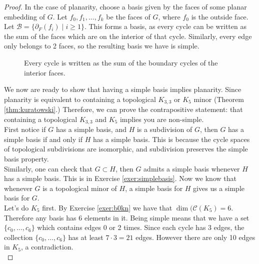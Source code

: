 \begin{proof}
 In the case of planarity, choose a basis given by the faces of some planar embedding of $G$. Let $f_0, f_1, \ldots, f_k$ be the faces of $G$, where $f_0$ is the outside face. Let $\mathcal B = \{\partial_F(f_i)\;|\; i\geq 1\}$. This forms a basis, as every cycle can be written as the sum of the faces which are on the interior of that cycle. Similarly, every edge only belongs to 2 faces, so the resulting basis we have is simple.  \\ 
 \begin{figure}
 \centering
\caption{Every cycle is written as the sum of the boundary cycles of the interior faces.}
\end{figure}
We now are ready to show that having a simple basis implies planarity. Since planarity is equivalent to containing a topological $K_{3,3}$ or $K_5$ minor (Theorem \ref{thm:kuratowski}.) Therefore, we can prove the contrapositive statement: that containing a topological $K_{3,3}$ and $K_5$ implies you are non-simple. \\
 First notice if $G$ has a simple basis, and $H$ is a subdivision of $G$, then $G$ has a simple basis if and only if $H$ has a simple basis. This is because the cycle spaces of topological subdivisions are isomorphic, and subdivision preserves the simple basis property. \\
 Similarly, one can check that $G\subset H$, then $G$ admits a simple basis whenever  $H$ has a simple basis. This is in Exercise \ref{exer:simplebasis}. Now we know that whenever $G$ is a topological minor of $H$, a simple basis for $H$ gives us a simple basis for $G$.  \\
 Let's do $K_5$ first. By Exercise \ref{exer:b0kn} we have that $\dim(\mathcal C(K_5)=6$. Therefore any basis has 6 elements in it. Being simple means that we have a set $\{c_0, \ldots, c_6\}$ which contains edges 0 or 2 times. Since each cycle has 3 edges, the collection $\{c_0, \ldots, c_6\}$ has at least $7\cdot 3 = 21$ edges. However there are only 10 edges in $K_5$, a contradiction.\\

\end{proof}
